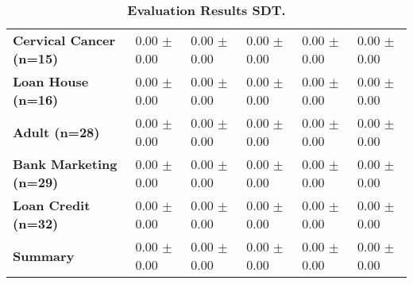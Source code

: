 \begin{table}[htb]
{\begin{tabular}{llllll}
\textbf{Cervical Cancer (n=15)                   } &  \phantom{0}0.00 $\pm$ \phantom{0}0.00 &             \phantom{0}0.00 $\pm$ \phantom{0}0.00 &  \phantom{0}0.00 $\pm$ \phantom{0}0.00 &  \phantom{0}0.00 $\pm$ \phantom{0}0.00 &  \phantom{0}0.00 $\pm$ \phantom{0}0.00 \\
\textbf{Loan House (n=16)                        } &  \phantom{0}0.00 $\pm$ \phantom{0}0.00 &             \phantom{0}0.00 $\pm$ \phantom{0}0.00 &  \phantom{0}0.00 $\pm$ \phantom{0}0.00 &  \phantom{0}0.00 $\pm$ \phantom{0}0.00 &  \phantom{0}0.00 $\pm$ \phantom{0}0.00 \\
\textbf{Adult (n=28)                             } &  \phantom{0}0.00 $\pm$ \phantom{0}0.00 &             \phantom{0}0.00 $\pm$ \phantom{0}0.00 &  \phantom{0}0.00 $\pm$ \phantom{0}0.00 &  \phantom{0}0.00 $\pm$ \phantom{0}0.00 &  \phantom{0}0.00 $\pm$ \phantom{0}0.00 \\
\textbf{Bank Marketing (n=29)                    } &  \phantom{0}0.00 $\pm$ \phantom{0}0.00 &             \phantom{0}0.00 $\pm$ \phantom{0}0.00 &  \phantom{0}0.00 $\pm$ \phantom{0}0.00 &  \phantom{0}0.00 $\pm$ \phantom{0}0.00 &  \phantom{0}0.00 $\pm$ \phantom{0}0.00 \\
\textbf{Loan Credit (n=32)                       } &  \phantom{0}0.00 $\pm$ \phantom{0}0.00 &             \phantom{0}0.00 $\pm$ \phantom{0}0.00 &  \phantom{0}0.00 $\pm$ \phantom{0}0.00 &  \phantom{0}0.00 $\pm$ \phantom{0}0.00 &  \phantom{0}0.00 $\pm$ \phantom{0}0.00 \\
\midrule
\textbf{Summary                                  } &  \phantom{0}0.00 $\pm$ \phantom{0}0.00 &             \phantom{0}0.00 $\pm$ \phantom{0}0.00 &  \phantom{0}0.00 $\pm$ \phantom{0}0.00 &  \phantom{0}0.00 $\pm$ \phantom{0}0.00 &  \phantom{0}0.00 $\pm$ \phantom{0}0.00 \\
\bottomrule
\end{tabular}%
}
\caption{\textbf{Evaluation Results SDT.}}
\label{tab:eval-results}
\end{table}
\newpage 
